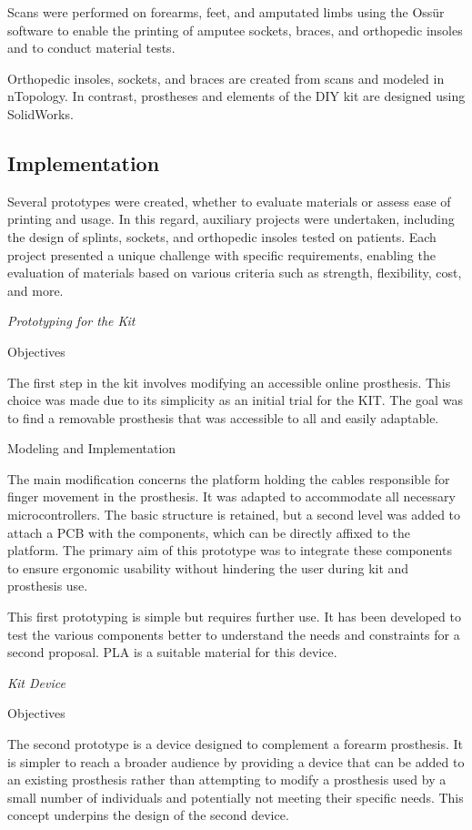 Scans were performed on forearms, feet, and amputated limbs using the Ossür software to enable the printing of amputee sockets, braces, and orthopedic insoles and to conduct material tests.

Orthopedic insoles, sockets, and braces are created from scans and modeled in nTopology. In contrast, prostheses and elements of the DIY kit are designed using SolidWorks.

\subsection{Implementation}

Several prototypes were created, whether to evaluate materials or assess ease of printing and usage. In this regard, auxiliary projects were undertaken, including the design of splints, sockets, and orthopedic insoles tested on patients. Each project presented a unique challenge with specific requirements, enabling the evaluation of materials based on various criteria such as strength, flexibility, cost, and more.

\textit{Prototyping for the Kit}
\item Objectives

The first step in the kit involves modifying an accessible online prosthesis. This choice was made due to its simplicity as an initial trial for the KIT. The goal was to find a removable prosthesis that was accessible to all and easily adaptable.

\item Modeling and Implementation

The main modification concerns the platform holding the cables responsible for finger movement in the prosthesis. It was adapted to accommodate all necessary microcontrollers. The basic structure is retained, but a second level was added to attach a PCB with the components, which can be directly affixed to the platform. The primary aim of this prototype was to integrate these components to ensure ergonomic usability without hindering the user during kit and prosthesis use.

This first prototyping is simple but requires further use. It has been developed to test the various components better to understand the needs and constraints for a second proposal. PLA is a suitable material for this device. 

\textit{Kit Device}
\item Objectives

The second prototype is a device designed to complement a forearm prosthesis. It is simpler to reach a broader audience by providing a device that can be added to an existing prosthesis rather than attempting to modify a prosthesis used by a small number of individuals and potentially not meeting their specific needs. This concept underpins the design of the second device.

